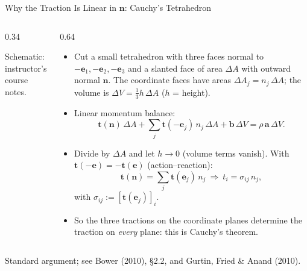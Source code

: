 \documentclass[aspectratio=169,11pt]{beamer}
\begin{document}
\begin{frame}{Why the Traction Is Linear in $\mathbf{n}$: Cauchy's Tetrahedron}
\begin{columns}[c,onlytextwidth]
\begin{column}{0.34\textwidth}
\centering
{}

{\tiny\color{DarkGray}Schematic: instructor's course notes.\par}
\end{column}
\begin{column}{0.64\textwidth}
\footnotesize
\begin{itemize}
\item Cut a small tetrahedron with three faces normal to $-\mathbf{e}_1,-\mathbf{e}_2,-\mathbf{e}_3$ and a slanted face of area $\Delta A$ with outward normal $\mathbf{n}$. The coordinate faces have areas $\Delta A_j = n_j\,\Delta A$; the volume is $\Delta V = \tfrac13 h\,\Delta A$ ($h$ = height).
\item Linear momentum balance:
\[
\mathbf{t}(\mathbf{n})\,\Delta A + \sum_{j}\mathbf{t}(-\mathbf{e}_j)\,n_j\,\Delta A + \mathbf{b}\,\Delta V = \rho\,\mathbf{a}\,\Delta V .
\]
\item Divide by $\Delta A$ and let $h\to 0$ (volume terms vanish). With $\mathbf{t}(-\mathbf{e}) = -\mathbf{t}(\mathbf{e})$ (action--reaction):
\[
\mathbf{t}(\mathbf{n}) = \sum_j \mathbf{t}(\mathbf{e}_j)\,n_j
\ \Longrightarrow\
t_i = \sigma_{ij}\,n_j,
\]
with $\sigma_{ij} := [\mathbf{t}(\mathbf{e}_j)]_i$.
\item So the three tractions on the coordinate planes determine the traction on \emph{every} plane: this is Cauchy's theorem.
\end{itemize}
\end{column}
\end{columns}
\vspace{1mm}
{\tiny\color{DarkGray}Standard argument; see Bower (2010), \S2.2, and Gurtin, Fried \& Anand (2010).\par}
\end{frame}
\end{document}
